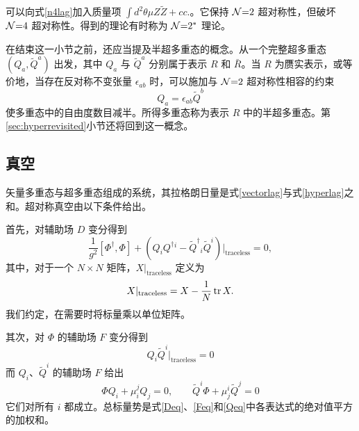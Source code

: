 可以向式\eqref{n4lag}加入质量项 $\int d^2\theta \mu Z\tilde Z + cc.$。它保持 $\mathcal{N}{=}2$ 超对称性，但破坏 $\mathcal{N}{=}4$ 超对称性。得到的理论有时称为 $\mathcal{N}{=}2^*$ 理论。

在结束这一小节之前，还应当提及半超多重态的概念。从一个完整超多重态 $(Q_a,\tilde Q^a)$ 出发，其中 $Q_a$ 与 $\tilde Q^a$ 分别属于表示 $R$ 和 $\bar R$。当 $R$ 为赝实表示，或等价地，当存在反对称不变张量 $\epsilon_{ab}$ 时，可以施加与 $\mathcal{N}{=}2$ 超对称性相容的约束
\begin{equation}
Q_a=\epsilon_{ab} \tilde Q^b
\end{equation}
使多重态中的自由度数目减半。所得多重态称为表示 $R$ 中的半超多重态。第\ref{sec:hyperrevisited}小节还将回到这一概念。

\subsection{真空}\label{sec:classicalvac}

矢量多重态与超多重态组成的系统，其拉格朗日量是式\eqref{vectorlag}与式\eqref{hyperlag}之和。超对称真空由以下条件给出。

首先，对辅助场 $D$ 变分得到
\begin{equation}
\frac{1}{g^2}[\Phi^\dagger,\Phi]+ (Q_i Q^\dagger{}^i-\tilde Q^\dagger{}_i \tilde Q^i)\big|_\text{traceless}=0,\label{Deq}
\end{equation}
其中，对于一个 $N\times N$ 矩阵，$X|_\text{traceless}$ 定义为
\begin{equation}
X|_\text{traceless}=X-\frac1N\mathop{\mathrm{tr}}\nolimits X.
\end{equation}
我们约定，在需要时将标量乘以单位矩阵。

其次，对 $\Phi$ 的辅助场 $F$ 变分得到
\begin{equation}
Q_i \tilde Q^i \big|_\text{traceless}=0\label{Feq}
\end{equation}
而 $Q_i$、$\tilde Q^i$ 的辅助场 $F$ 给出
\begin{equation}
\Phi Q_i +\mu^j_i Q_j =0, \qquad \tilde Q^i \Phi + \mu^i_j \tilde Q^j=0 \label{Qeq}
\end{equation}
它们对所有 $i$ 都成立。总标量势是式\eqref{Deq}、\eqref{Feq}和\eqref{Qeq}中各表达式的绝对值平方的加权和。

